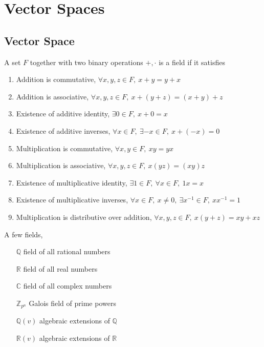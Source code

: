 \chapter{Vector Spaces}
\section{Vector Space}
	\begin{axiom}[Field]
		A set $F$ together with two binary operations $+,\cdot$ is a field if it satisfies
		\begin{enumerate} 
			\item Addition is commutative, $\forall x,y,z \in F,\ x+y = y+x$
			\item Addition is associative, $\forall x,y,z \in F,\ x+(y+z) = (x+y)+z$
			\item Existence of additive identity, $\exists 0 \in F,\ x+0=x$
			\item Existence of additive inverses, $\forall x \in F,\ \exists -x \in F,\ x+(-x)=0$
			\item Multiplication is commutative, $\forall x,y \in F,\ xy = yx$
			\item Multiplication is associative, $\forall x,y,z \in F,\ x(yz) = (xy)z$
			\item Existence of multiplicative identity, $\exists 1 \in F,\ \forall x \in F,\ 1x = x$
			\item Existence of multiplicative inverses, $\forall x \in F,\ x \ne 0,\ \exists x^{-1} \in F,\ xx^{-1} = 1$
			\item Multiplication is distributive over addition, $\forall x,y,z \in F,\ x(y+z) = xy+xz$
		\end{enumerate}
	\end{axiom}
	\begin{remark}
		A few fields,
		\begin{enumerate}
			\item[$\mathbb{Q}$] field of all rational numbers
			\item[$\mathbb{R}$] field of all real numbers
			\item[$\mathbb{C}$] field of all complex numbers
			\item[$\mathbb{Z}_{p^n}$] Galois field of prime powers
			\item[$\mathbb{Q}(v)$] algebraic extensions of $\mathbb{Q}$
			\item[$\mathbb{R}(v)$] algebraic extensions of $\mathbb{R}$
		\end{enumerate}
	\end{remark}
